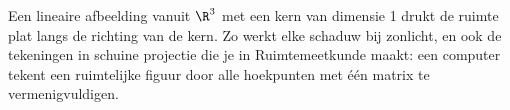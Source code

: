 Een lineaire afbeelding vanuit $\R^3$ met een kern van dimensie 1 drukt de ruimte plat langs de richting van de kern. Zo werkt elke schaduw bij zonlicht, en ook de tekeningen in schuine projectie die je in Ruimtemeetkunde maakt: een computer tekent een ruimtelijke figuur door alle hoekpunten met één matrix te vermenigvuldigen.

\begin{oefeningen}
\end{oefeningen}

\opdrachtenkop

\begin{oefeningen}





















\end{oefeningen}



\begin{oefeningen}


\end{oefeningen}

